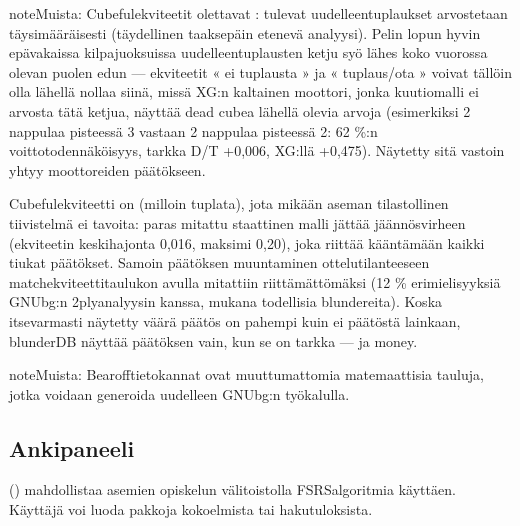 \documentclass[letterpaper,10pt,finnish]{sphinxmanual}
\begin{document}
\begin{sphinxadmonition}{note}{Muista:}
\sphinxAtStartPar
Cubeful\sphinxhyphen{}ekviteetit olettavat : tulevat uudelleentuplaukset arvostetaan täysimääräisesti (täydellinen taaksepäin etenevä analyysi). Pelin lopun hyvin epävakaissa kilpajuoksuissa uudelleentuplausten ketju syö lähes koko vuorossa olevan puolen edun — ekviteetit « ei tuplausta » ja « tuplaus/ota » voivat tällöin olla lähellä nollaa siinä, missä XG:n kaltainen moottori, jonka kuutiomalli ei arvosta tätä ketjua, näyttää dead cubea lähellä olevia arvoja (esimerkiksi 2 nappulaa pisteessä 3 vastaan 2 nappulaa pisteessä 2: 62 \%:n voittotodennäköisyys, tarkka D/T +0,006, XG:llä +0,475). Näytetty  sitä vastoin yhtyy moottoreiden päätökseen.
\end{sphinxadmonition}

\sphinxAtStartPar
{} Cubeful\sphinxhyphen{}ekviteetti on  (milloin tuplata), jota mikään aseman tilastollinen tiivistelmä ei tavoita: paras mitattu staattinen malli jättää jäännösvirheen (ekviteetin keskihajonta 0,016, maksimi 0,20), joka riittää kääntämään kaikki tiukat päätökset. Samoin päätöksen muuntaminen ottelutilanteeseen match\sphinxhyphen{}ekviteettitaulukon avulla mitattiin riittämättömäksi (12 \% erimielisyyksiä GNUbg:n 2\sphinxhyphen{}ply\sphinxhyphen{}analyysin kanssa, mukana todellisia blundereita). Koska itsevarmasti näytetty väärä päätös on pahempi kuin ei päätöstä lainkaan, blunderDB näyttää päätöksen vain, kun se on tarkka — ja money.

\begin{sphinxadmonition}{note}{Muista:}
\sphinxAtStartPar
Bearoff\sphinxhyphen{}tietokannat ovat muuttumattomia matemaattisia tauluja, jotka voidaan generoida uudelleen GNUbg:n \sphinxhyphen{}työkalulla.
\end{sphinxadmonition}


\subsection{Anki\sphinxhyphen{}paneeli}
\label{\detokenize{manuel:panneau-anki}}\label{\detokenize{manuel:id10}}
\sphinxAtStartPar
{} () mahdollistaa asemien opiskelun välitoistolla FSRS\sphinxhyphen{}algoritmia käyttäen. Käyttäjä voi luoda pakkoja kokoelmista tai hakutuloksista.
\end{document}
